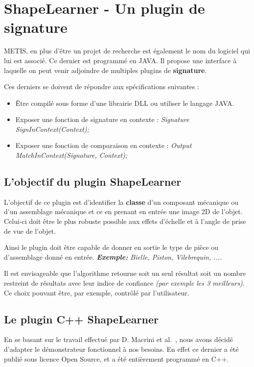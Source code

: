 \section{ShapeLearner - Un plugin de signature}

METIS, en plus d'être un projet de recherche est également le nom du logiciel qui lui est associé. Ce dernier est programmé en JAVA. Il propose une interface à laquelle on peut venir adjoindre de multiples plugins de \textbf{signature}.

Ces derniers se doivent de répondre aux spécifications suivantes :
\begin{itemize}
	\item Être compilé sous forme d'une librairie DLL ou utiliser le langage JAVA.
	\item Exposer une fonction de signature en contexte : \textit{Signature SignInContext(Context);}
	\item Exposer une fonction de comparaison en contexte : \textit{Output MatchInContext(Signature, Context);}
\end{itemize}

\subsection{L'objectif du plugin ShapeLearner}

L'objectif de ce plugin est d'identifier la \textbf{classe} d'un composant mécanique ou d'un assemblage mécanique et ce en prenant en entrée une image 2D de l'objet. Celui-ci doit être le plus robuste possible aux effets d'échelle et à l'angle de prise de vue de l'objet.

Ainsi le plugin doit être capable de donner en sortie le type de pièce ou d'assemblage donné en entrée. \textit{\textbf{Exemple:} Bielle, Piston, Vilebrequin, ...}.

Il est envisageable que l'algorithme retourne soit un seul résultat soit un nombre restreint de résultats avec leur indice de confiance \textit{(par exemple les 3 meilleurs)}. Ce choix pouvant être, par exemple, contrôlé par l'utilisateur. 

\subsection{Le plugin C++ ShapeLearner}

En se basant sur le travail effectué par D. Macrini et al.~\cite{Macrini2002}, nous avons décidé d'adapter le démonstrateur fonctionnel à nos besoins. En effet ce dernier a été publié sous licence Open Source, et a été entièrement programmé en C++.


